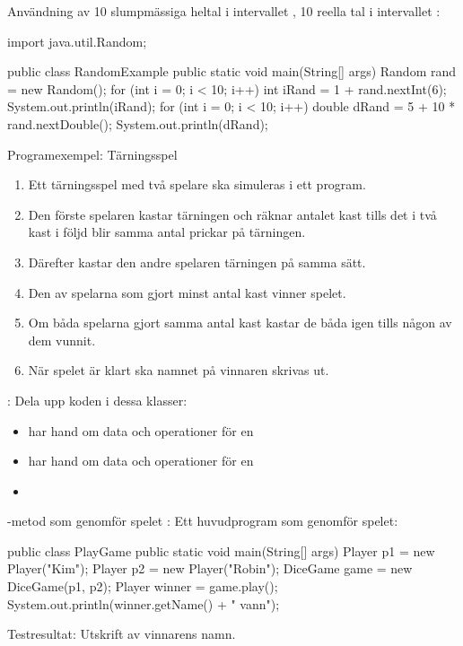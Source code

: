 \documentclass{lecturenotes}
\begin{document}
\begin{Slide}
{Användning av }
10 slumpmässiga heltal i intervallet \code{[1, 6]}, 10 reella tal i intervallet \code{[5.0,~15.0)}:

\begin{Code}
import java.util.Random;

public class RandomExample {
    public static void main(String[] args) {
        Random rand = new Random();
        for (int i = 0; i < 10; i++) {
            int iRand = 1 + rand.nextInt(6);
            System.out.println(iRand);
        }
        for (int i = 0; i < 10; i++) {
            double dRand = 5 + 10 * rand.nextDouble();
            System.out.println(dRand);
        }
    }
}
\end{Code}
\end{Slide} 

\begin{Slide}{Programexempel: Tärningsspel} \footnotesize
{} 
\begin{enumerate} 
\item Ett tärningsspel med två spelare ska simuleras i ett program. 
\item Den förste spelaren kastar tärningen och räknar antalet kast tills det i två kast i följd blir samma antal prickar på tärningen. 
\item Därefter kastar den andre spelaren tärningen på samma sätt. 
\item Den av spelarna som gjort minst antal kast vinner spelet. 
\item Om båda spelarna gjort samma antal kast kastar de båda igen tills någon av dem vunnit. 
\item När spelet är klart ska namnet på vinnaren skrivas ut.

\end{enumerate}

:  Dela upp koden i dessa klasser: 
\begin{itemize}
\item {} har hand om data och operationer för en 
\item {} har hand om data och operationer för en 
\item {} 
\end{itemize}
\end{Slide} 

\begin{Slide}
{-metod som genomför spelet}
: Ett huvudprogram som genomför spelet:
\begin{Code}
public class PlayGame {
    public static void main(String[] args) {
        Player p1 = new Player("Kim");
        Player p2 = new Player("Robin");
        DiceGame game = new DiceGame(p1, p2);
        Player winner = game.play();
        System.out.println(winner.getName() +  " vann");
    }
}
\end{Code}
Testresultat: Utskrift av vinnarens namn.
\end{Slide} 
\end{document}
